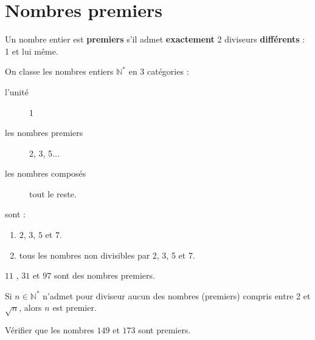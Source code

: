 %	



%	 


\newpage 
{}  
\pagestyle{scrheadings} %
\onehalfspacing   


\section{Nombres premiers}
\begin{definition}
	Un nombre entier est \textbf{premiers} s'il admet \textbf{exactement} 2 diviseurs \textbf{différents} : 1 et lui même.
\end{definition}
On classe les nombres entiers $\mathbb{N}^*$ en 3 catégories :
\begin{description}
	\item[l'unité] 1
	\item[les nombres premiers] 2, 3, 5...
	\item[les nombres composés] tout le reste.
\end{description}
\begin{theorem}   sont :
	\begin{enumerate}[label=\textbullet, leftmargin=*]
		\item $2$, $3$, $5$ et $7$.
		\item tous les nombres non divisibles par 2, 3, 5 et 7.
	\end{enumerate}
\end{theorem}
\begin{example}
	$11$ , $31$ et $97$ sont des nombres premiers.
\end{example} 
\begin{theorem}  
	Si $n\in\mathbb{N}^*$ n'admet pour diviseur aucun des nombres (premiers) compris entre 2 et $\sqrt{n}$, alors $n$ est premier.
\end{theorem}
\begin{example}
	Vérifier que les nombres $149$ et $173$ sont premiers.
\end{example}

